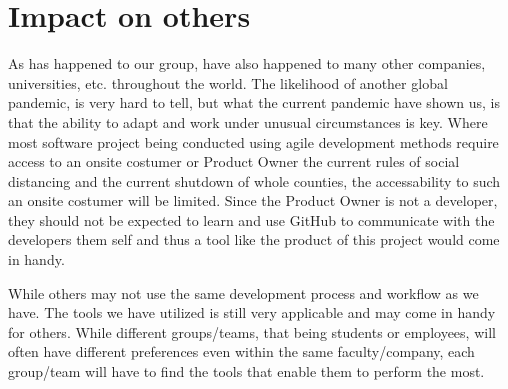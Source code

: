 \section{Impact on others}
As has happened to our group, have also happened to many other companies, universities, etc. throughout the world.
The likelihood of another global pandemic, is very hard to tell, but what the current pandemic have shown us, is that the ability to adapt and work under unusual circumstances is key.
Where most software project being conducted using agile development methods require access to an onsite costumer or Product Owner the current rules of social distancing and the current shutdown of whole counties, the accessability to such an onsite costumer will be limited.
Since the Product Owner is not a developer, they should not be expected to learn and use GitHub to communicate with the developers them self and thus a tool like the product of this project would come in handy.

While others may not use the same development process and workflow as we have.
The tools we have utilized is still very applicable and may come in handy for others. 
While different groups/teams, that being students or employees, will often have different preferences even within the same faculty/company, each group/team will have to find the tools that enable them to perform the most.